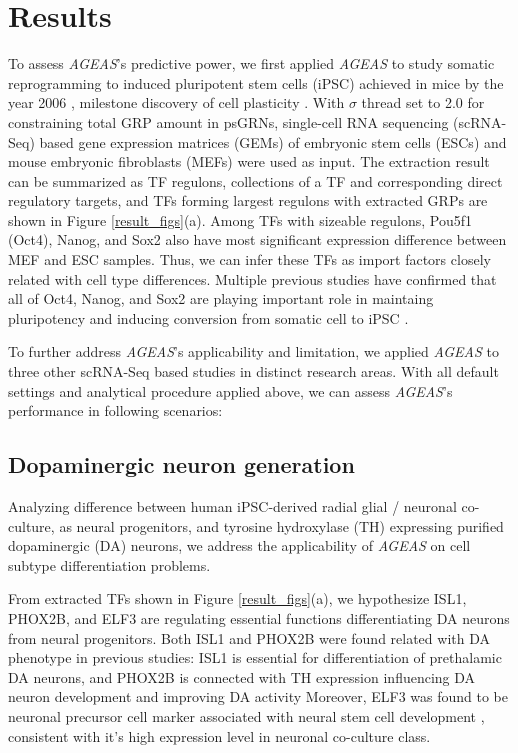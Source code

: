 \documentclass[fleqn,10pt]{wlscirep}
\begin{document}
\section*{Results}
  \label{res}
  To assess \emph{AGEAS}'s predictive power, we first applied \emph{AGEAS} to study somatic reprogramming to induced pluripotent stem cells (iPSC) achieved in mice by
  the year 2006 \cite{yamanaka_2006}, milestone discovery of cell plasticity \cite{cell_repro_review}.
  With $\sigma$ thread set to 2.0 for constraining total GRP amount in psGRNs, single-cell RNA sequencing (scRNA-Seq) based gene expression matrices (GEMs) of embryonic stem cells (ESCs) and mouse embryonic fibroblasts (MEFs) were used as input.
  The extraction result can be summarized as TF regulons, collections of a TF and corresponding direct regulatory targets, and TFs forming largest regulons with extracted GRPs are shown in Figure \ref{result_figs}(a).
  Among TFs with sizeable regulons, Pou5f1 (Oct4), Nanog, and Sox2 also have most significant expression difference between MEF and ESC samples.
  Thus, we can infer these TFs as import factors closely related with cell type differences.
  Multiple previous studies have confirmed that all of Oct4, Nanog, and Sox2 are playing important role in maintaing pluripotency \cite{niwa_2007} and inducing conversion from somatic cell to iPSC \cite{yamanaka_2006, ips7f, ipsOK, oct4_nanog_sox2_lin28, oct4_nanog_sox2}.

  To further address \emph{AGEAS}'s applicability and limitation, we applied \emph{AGEAS} to three other scRNA-Seq based studies in distinct research areas.
  With all default settings and analytical procedure applied above, we can assess \emph{AGEAS}'s performance in following scenarios:

  \subsection*{Dopaminergic neuron generation}
  Analyzing difference between human iPSC-derived radial glial / neuronal co-culture, as neural progenitors\cite{ASCL1_dopaminergic_neuron_2021}, and tyrosine hydroxylase (TH) expressing purified dopaminergic (DA) neurons, we address the applicability of \emph{AGEAS} on cell subtype differentiation problems.

  From extracted TFs shown in Figure \ref{result_figs}(a), we hypothesize ISL1, PHOX2B, and ELF3 are regulating essential functions differentiating DA neurons from neural progenitors.
  Both ISL1 and PHOX2B were found related with DA phenotype in previous studies:
  ISL1 is essential for differentiation of prethalamic DA neurons\cite{isl1_da},
  and PHOX2B is connected with TH expression influencing DA neuron development and improving DA activity \cite{phox2_caudal_da, phox2_rat_da}
  Moreover, ELF3 was found to be neuronal precursor cell marker associated with neural stem cell development \cite{ELF3_precursor_marker}, consistent with it's high expression level in neuronal co-culture class.
\end{document}
